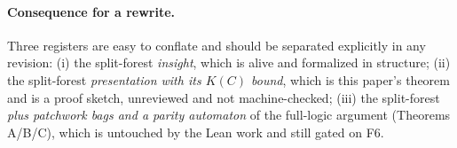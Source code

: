 \documentclass[11pt]{article}
\theoremstyle{plain}
\theoremstyle{definition}
\begin{document}
\paragraph{Consequence for a rewrite.} Three registers are easy to conflate and
should be separated explicitly in any revision: (i) the split-forest
\emph{insight}, which is alive and formalized in structure; (ii) the
split-forest \emph{presentation with its $K(C)$ bound}, which is this paper's
theorem and is a proof sketch, unreviewed and not machine-checked; (iii) the
split-forest \emph{plus patchwork bags and a parity automaton} of the
full-logic argument (Theorems A/B/C), which is untouched by the Lean work and
still gated on F6.
\end{document}
